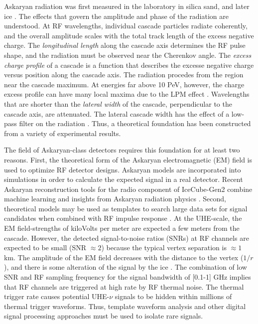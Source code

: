 \documentclass[amsmath,amssymb,aps,prd,10pt,twocolumn]{revtex4}
\begin{document}
Askaryan radiation was first measured in the laboratory in silica sand, and later ice \cite{saltzberg,10.1103/PhysRevD.74.043002,ask_ice}.  The effects that govern the amplitude and phase of the radiation are understood.  At RF wavelengths, individual cascade particles radiate coherently, and the overall amplitude scales with the total track length of the excess negative charge.  The \textit{longitudinal length} along the cascade axis determines the RF pulse shape, and the radiation must be observed near the Cherenkov angle.  The \textit{excess charge profile} of a cascade is a function that describes the excesse negative charge versus position along the cascade axis.  The radiation procedes from the region near the cascade maximum.  At energies far above 10 PeV, however, the charge excess profile can have many local maxima due to the LPM effect \cite{10.1103/physrevd.84.103003,10.1016/j.astropartphys.2017.03.008}.  Wavelengths that are shorter than the \textit{lateral width} of the cascade, perpendicular to the cascade axis, are attenuated.  The lateral cascade width has the effect of a low-pass filter on the radiation \cite{10.1016/j.astropartphys.2017.03.008}.  Thus, a theoretical foundation has been constructed from a variety of experimental results.

The field of Askaryan-class detectors requires this foundation for at least two reasons.  First, the theoretical form of the Askaryan electromagnetic (EM) field is used to optimize RF detector designs.  Askaryan models are incorporated into simulations \cite{dookayka2011characterizing,testbed,10.1140/epjc/s10052-020-7612-8} in order to calculate the expected signal in a real detector.  Recent Askaryan reconstruction tools for the radio component of IceCube-Gen2 combine machine learning and insights from Askaryan radiation physics \cite{10.1140/epjc/s10052-019-6971-5,10.1088/1748-0221/15/09/p09039,IFT}.  Second, theoretical models may be used as templates to search large data sets for signal candidates when combined with RF impulse response \cite{10.1088/1475-7516/2020/03/053,10.1016/j.astropartphys.2014.09.002}.  At the UHE-scale, the EM field-strengths of kiloVolts per meter are expected a few meters from the cascade.  However, the detected signal-to-noise ratios (SNRs) at RF channels are expected to be small (SNR  $\approx 2$) because the typical vertex separation is $\approx 1$ km.  The amplitude of the EM field decreases with the distance to the vertex ($1/r$), and there is some alteration of the signal by the ice \cite{10.3189/2015jog14j214,Barwick:2018497,ALLISON201963}.  The combination of low SNR and RF sampling frequency for the signal bandwidth of [0.1-1] GHz implies that RF channels are triggered at high rate by RF thermal noise.  The thermal trigger rate causes potential UHE-$\nu$ signals to be hidden within millions of thermal trigger waveforms.  Thus, template waveform analysis and other digital signal processing approaches must be used to isolate rare signals.
\end{document}
